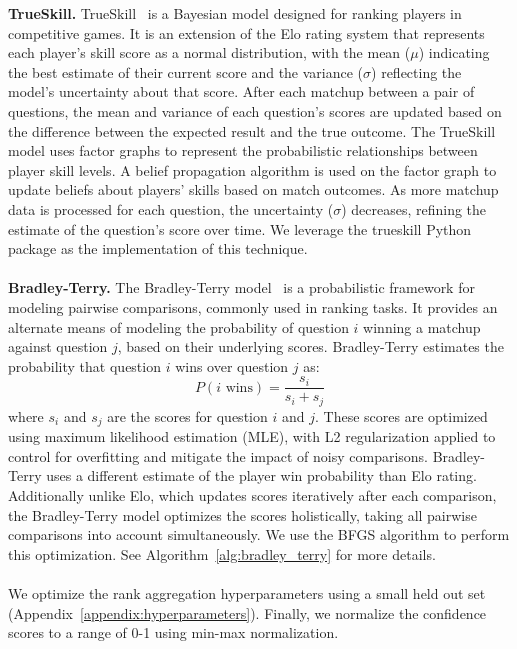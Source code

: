 \noindent \textbf{TrueSkill.} TrueSkill~\citep{true_skill} is a Bayesian model designed for ranking players in competitive games. It is an extension of the Elo rating system that represents each player's skill score as a normal distribution, with the mean ($\mu$) indicating the best estimate of their current score and the variance ($\sigma$) reflecting the model's uncertainty about
that score. After each matchup between a pair of questions, the mean and variance of each question's scores are updated based on the difference between the expected result and the true outcome. The TrueSkill model uses factor graphs to represent the probabilistic relationships between player skill levels. A belief propagation algorithm is used on the factor graph to update beliefs about players' skills based on match outcomes. As more matchup data is processed for each question, the uncertainty ($\sigma$) decreases, refining the estimate of the question’s score over time. We leverage the trueskill Python package as the implementation of this technique. \\\\
\noindent\textbf{Bradley-Terry.} The Bradley-Terry model~\citep{bradley_terry} is a probabilistic framework for modeling pairwise comparisons, commonly used in ranking tasks. It provides an alternate means of modeling the probability of question $i$ winning a matchup against question $j$, based on their underlying scores. Bradley-Terry estimates the probability that question $i$ wins over question $j$ as:\\
\begin{equation}
    P(i \text{ wins}) = \frac{s_i}{s_i + s_j}
\end{equation}
where $s_i$ and $s_j$ are the scores for question $i$ and $j$. These scores are optimized using maximum likelihood estimation (MLE), with L2 regularization applied to control for overfitting and mitigate the impact of noisy comparisons. Bradley-Terry uses a different estimate of the player win probability than Elo rating.
Additionally unlike Elo, which updates scores iteratively after each comparison, the Bradley-Terry model optimizes the scores holistically, taking all pairwise comparisons into account simultaneously. We use the BFGS algorithm to perform this optimization. See Algorithm~\ref{alg:bradley_terry} for more details.\\\\
We optimize the rank aggregation hyperparameters using a small held out set (Appendix~\ref{appendix:hyperparameters}). Finally, we normalize the confidence scores to a range of 0-1 using min-max normalization.

